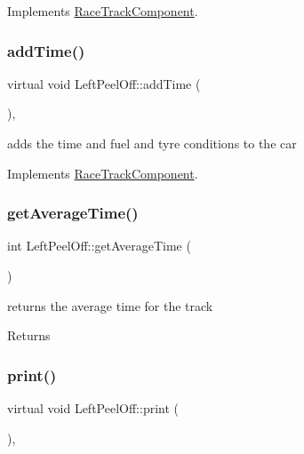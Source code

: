 Implements \mbox{\hyperlink{class_race_track_component_af89a6b453dfd3fb39fce27576012106f}{Race\+Track\+Component}}.

\mbox{\label{class_left_peel_off_a579d92a784406a8b4060dec68a832db0}} 
\subsubsection{\texorpdfstring{add\+Time()}{addTime()}}
{\footnotesize\ttfamily virtual void Left\+Peel\+Off\+::add\+Time (\begin{DoxyParamCaption}{ }\end{DoxyParamCaption})\hspace{0.3cm}{\ttfamily [inline]}, {\ttfamily [virtual]}}

adds the time and fuel and tyre conditions to the car 

Implements \mbox{\hyperlink{class_race_track_component_aa815404c45ba7df3786c3add177eb7e6}{Race\+Track\+Component}}.

\mbox{\label{class_left_peel_off_aa5eb8bb7d48cf76f7ad2ac2483d3901f}} 
\subsubsection{\texorpdfstring{get\+Average\+Time()}{getAverageTime()}}
{\footnotesize\ttfamily int Left\+Peel\+Off\+::get\+Average\+Time (\begin{DoxyParamCaption}{ }\end{DoxyParamCaption})\hspace{0.3cm}{\ttfamily [inline]}}

returns the average time for the track \begin{DoxyReturn}{Returns}

\end{DoxyReturn}
\mbox{\label{class_left_peel_off_aafa7fd3e608c6b08ea8b1bde7447c4f3}} 
\subsubsection{\texorpdfstring{print()}{print()}}
{\footnotesize\ttfamily virtual void Left\+Peel\+Off\+::print (\begin{DoxyParamCaption}{ }\end{DoxyParamCaption})\hspace{0.3cm}{\ttfamily [inline]}, {\ttfamily [virtual]}}

